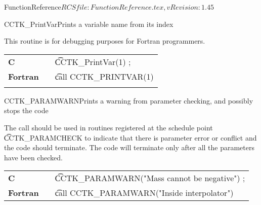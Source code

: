 \begin{cactuspart}{5}{FunctionReference}{$RCSfile: FunctionReference.tex,v $}{$Revision: 1.45 $}
\begin{CCTKFunc}{CCTK\_PrintVar}{Prints a variable name from its index}
\label{CCTK-PrintVar}
\subroutine{}{}{}
\showargs
\begin{params}
\end{params}
\begin{discussion}
This routine is for debugging purposes for Fortran programmers.
\end{discussion}
\begin{examples}
\begin{tabular}{@{}p{3cm}cp{11cm}}
\hfill {\bf C} && {\t CCTK\_PrintVar(1) ;}
\\
\hfill {\bf Fortran} && {\t call CCTK\_PRINTVAR(1)}\\
\\
\end{tabular}
\end{examples}
\begin{errorcodes}
\end{errorcodes}
\end{CCTKFunc}



\begin{CCTKFunc}{CCTK\_PARAMWARN}{Prints a warning from parameter checking, and possibly stops the code}
\label{CCTK-PARAMWARN}
\subroutine{}{}{}
\showargs
\begin{params}
\end{params}
\begin{discussion}
The call should be used in routines registered at the schedule point {\t CCTK\_PARAMCHECK}
to indicate that there is parameter error or conflict and the code should
terminate. The code will terminate only after all the parameters have been
checked.
\end{discussion}
\begin{examples}
\begin{tabular}{@{}p{3cm}cp{11cm}}
\hfill {\bf C} && {\t CCTK\_PARAMWARN("Mass cannot be negative") };
\\
\hfill {\bf Fortran} && {\t call  CCTK\_PARAMWARN("Inside interpolator")}
\\
\end{tabular}
\end{examples}
\begin{errorcodes}
\end{errorcodes}
\end{CCTKFunc}




\end{cactuspart}
